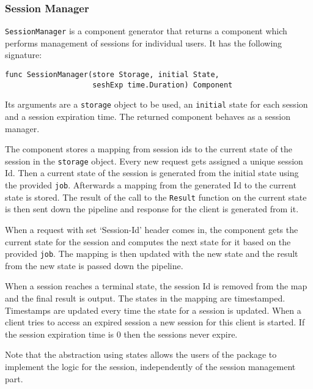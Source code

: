 \subsubsection{Session Manager}
\texttt{SessionManager} is a component generator that returns a component
which performs management of sessions for individual users. It has the following signature:
\begin{lstlisting}
func SessionManager(store Storage, initial State, 
                    seshExp time.Duration) Component
\end{lstlisting}
Its arguments are a \texttt{storage} object to be used, an \texttt{initial} 
state for each session and a session expiration time.
The returned component behaves as a session manager. 

The component stores a mapping from session ids to the current state of the session
in the \texttt{storage} object.
Every new request gets assigned a unique session Id. Then a current state
of the session is generated from the initial state using the provided
\texttt{job}. Afterwards a mapping from the generated Id to the current state
is stored. The result of the call to the \texttt{Result} function on the
current state is then sent down the pipeline and response for the client 
is generated from it.

When a request with set `Session-Id' header comes in, the component gets the current 
state for the session and computes the next state for it based on the provided 
\texttt{job}.
The mapping is then updated with the new state and the result from the new state
is passed down the pipeline.

When a session reaches a terminal state, the session Id is removed from the map
and the final result is output.
The states in the mapping are timestamped. Timestamps are updated every time
the state for a session is updated. When a client tries to access an expired
session a new session for this client is started. If the session expiration
time is 0 then the sessions never expire.

Note that the abstraction using states allows the users of the 
package to implement the logic for the session, independently of 
the session management part.

